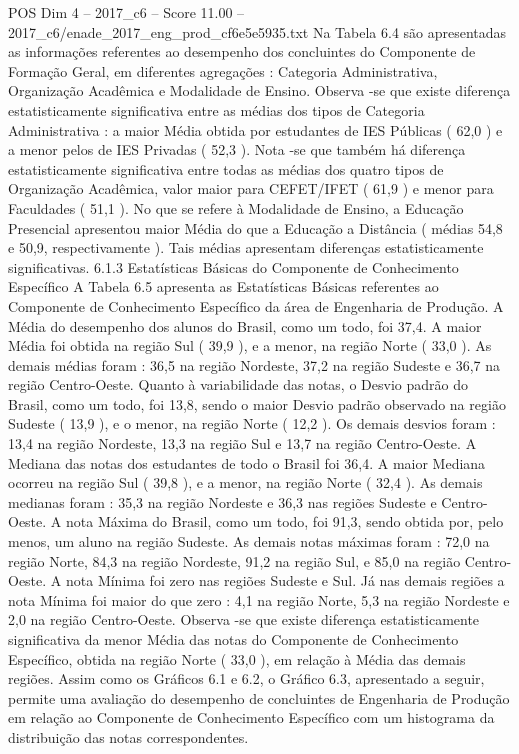 \begin{textsample}{POS Dim 4 – 2017\_c6 – Score 11.00 – 2017\_c6/enade\_2017\_eng\_prod\_cf6e5e5935.txt}
Na Tabela 6.4 são apresentadas as informações referentes ao desempenho dos concluintes do Componente de Formação Geral, em diferentes agregações : Categoria Administrativa, Organização Acadêmica e Modalidade de Ensino.
Observa -se que existe diferença estatisticamente significativa entre as médias dos tipos de Categoria Administrativa : a maior Média obtida por estudantes de IES Públicas ( 62,0 ) e a menor pelos de IES Privadas ( 52,3 ).
Nota -se que também há diferença estatisticamente significativa entre todas as médias dos quatro tipos de Organização Acadêmica, valor maior para CEFET/IFET ( 61,9 ) e menor para Faculdades ( 51,1 ).
No que se refere à Modalidade de Ensino, a Educação Presencial apresentou maior Média do que a Educação a Distância ( médias 54,8 e 50,9, respectivamente ).
Tais médias apresentam diferenças estatisticamente significativas. 6.1.3 Estatísticas Básicas do Componente de Conhecimento Específico A Tabela 6.5 apresenta as Estatísticas Básicas referentes ao Componente de Conhecimento Específico da área de Engenharia de Produção.
A Média do desempenho dos alunos do Brasil, como um todo, foi 37,4.
A maior Média foi obtida na região Sul ( 39,9 ), e a menor, na região Norte ( 33,0 ).
As demais médias foram : 36,5 na região Nordeste, 37,2 na região Sudeste e 36,7 na região Centro-Oeste.
Quanto à variabilidade das notas, o Desvio padrão do Brasil, como um todo, foi 13,8, sendo o maior Desvio padrão observado na região Sudeste ( 13,9 ), e o menor, na região Norte ( 12,2 ).
Os demais desvios foram : 13,4 na região Nordeste, 13,3 na região Sul e 13,7 na região Centro-Oeste.
A Mediana das notas dos estudantes de todo o Brasil foi 36,4.
A maior Mediana ocorreu na região Sul ( 39,8 ), e a menor, na região Norte ( 32,4 ).
As demais medianas foram : 35,3 na região Nordeste e 36,3 nas regiões Sudeste e Centro-Oeste.
A nota Máxima do Brasil, como um todo, foi 91,3, sendo obtida por, pelo menos, um aluno na região Sudeste.
As demais notas máximas foram : 72,0 na região Norte, 84,3 na região Nordeste, 91,2 na região Sul, e 85,0 na região Centro-Oeste.
A nota Mínima foi zero nas regiões Sudeste e Sul.
Já nas demais regiões a nota Mínima foi maior do que zero : 4,1 na região Norte, 5,3 na região Nordeste e 2,0 na região Centro-Oeste.
Observa -se que existe diferença estatisticamente significativa da menor Média das notas do Componente de Conhecimento Específico, obtida na região Norte ( 33,0 ), em relação à Média das demais regiões.
Assim como os Gráficos 6.1 e 6.2, o Gráfico 6.3, apresentado a seguir, permite uma avaliação do desempenho de concluintes de Engenharia de Produção em relação ao Componente de Conhecimento Específico com um histograma da distribuição das notas correspondentes.

\end{textsample}
